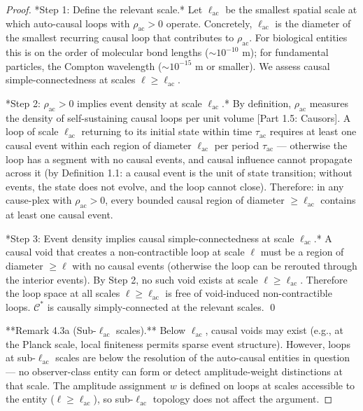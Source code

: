 \documentclass[11pt]{article}
\theoremstyle{definition}
\theoremstyle{remark}
\begin{document}
\begin{proof}

*Step 1: Define the relevant scale.* Let $\ell_{\mathrm{ac}}$ be the smallest spatial scale at which auto-causal loops with $\rho_{\mathrm{ac}} > 0$ operate. Concretely, $\ell_{\mathrm{ac}}$ is the diameter of the smallest recurring causal loop that contributes to $\rho_{\mathrm{ac}}$. For biological entities this is on the order of molecular bond lengths ($\sim 10^{-10}$ m); for fundamental particles, the Compton wavelength ($\sim 10^{-15}$ m or smaller). We assess causal simple-connectedness at scales $\ell \geq \ell_{\mathrm{ac}}$.

*Step 2: $\rho_{\mathrm{ac}} > 0$ implies event density at scale $\ell_{\mathrm{ac}}$.* By definition, $\rho_{\mathrm{ac}}$ measures the density of self-sustaining causal loops per unit volume [Part 1.5: Causors]. A loop of scale $\ell_{\mathrm{ac}}$ returning to its initial state within time $\tau_{\mathrm{ac}}$ requires at least one causal event within each region of diameter $\ell_{\mathrm{ac}}$ per period $\tau_{\mathrm{ac}}$ — otherwise the loop has a segment with no causal events, and causal influence cannot propagate across it (by Definition 1.1: a causal event is the unit of state transition; without events, the state does not evolve, and the loop cannot close). Therefore: in any cause-plex with $\rho_{\mathrm{ac}} > 0$, every bounded causal region of diameter $\geq \ell_{\mathrm{ac}}$ contains at least one causal event.

*Step 3: Event density implies causal simple-connectedness at scale $\ell_{\mathrm{ac}}$.* A causal void that creates a non-contractible loop at scale $\ell$ must be a region of diameter $\geq \ell$ with no causal events (otherwise the loop can be rerouted through the interior events). By Step 2, no such void exists at scale $\ell \geq \ell_{\mathrm{ac}}$. Therefore the loop space at all scales $\ell \geq \ell_{\mathrm{ac}}$ is free of void-induced non-contractible loops. $\mathcal{C}^{\ast}$ is causally simply-connected at the relevant scales. \qed

**Remark 4.3a (Sub-$\ell_{\mathrm{ac}}$ scales).** Below $\ell_{\mathrm{ac}}$, causal voids may exist (e.g., at the Planck scale, local finiteness permits sparse event structure). However, loops at sub-$\ell_{\mathrm{ac}}$ scales are below the resolution of the auto-causal entities in question — no observer-class entity can form or detect amplitude-weight distinctions at that scale. The amplitude assignment $w$ is defined on loops at scales accessible to the entity ($\ell \geq \ell_{\mathrm{ac}}$), so sub-$\ell_{\mathrm{ac}}$ topology does not affect the argument.


\end{proof}
\end{document}
